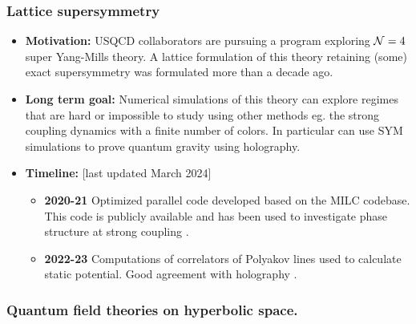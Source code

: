 \documentclass[12pt,hyperpdf]{article}
\begin{document}
\subsubsection{Lattice supersymmetry}
\begin{itemize}
\item{\bf Motivation:}
USQCD collaborators are pursuing a program exploring ${\cal N}=4$ super Yang-Mills
theory. A lattice formulation of this theory retaining (some) exact supersymmetry was formulated
more than a decade ago. 
\item {\bf Long term goal:} Numerical simulations of this theory can explore regimes
that are hard or impossible to study using other methods eg. the strong coupling dynamics
with a finite number of colors. In particular can use SYM simulations to prove quantum gravity using holography.
\item{\bf Timeline:} \hfill [last updated March 2024]
   \begin{itemize}
   \item{\bf 2020-21} Optimized parallel code developed based on the 
   MILC codebase. This code is publicly available and has been used to investigate phase structure at strong coupling \cite{Catterall:2020lsi}.
   \item{\bf 2022-23} Computations of correlators of Polyakov lines used to calculate static potential. Good agreement with holography \cite{Catterall:2023tmr}.
\end{itemize}
\end{itemize}

\subsubsection{Quantum field theories on hyperbolic space.}
\end{document}
